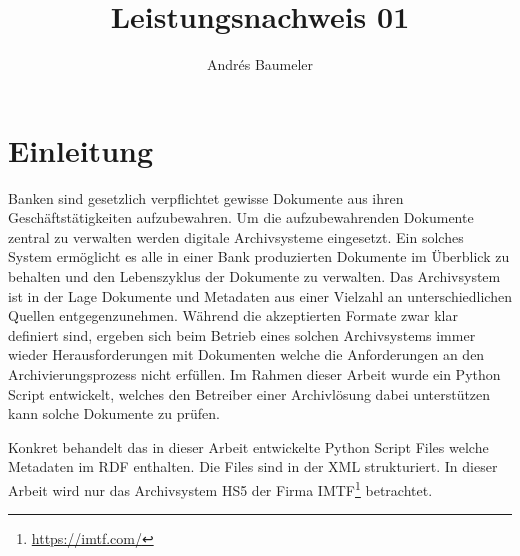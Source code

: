 \documentclass[a4paper,oneside, 12pt]{report}
\title{Leistungsnachweis 01}
\author{Andrés Baumeler}
\begin{document}

\pagestyle{empty} %





\cleardoublepage
\tableofcontents %
\cleardoublepage %

\pagestyle{plain} %



\chapter{Einleitung}\label{sec:motivation}
Banken sind gesetzlich verpflichtet gewisse Dokumente aus ihren Geschäftstätigkeiten aufzubewahren. Um die aufzubewahrenden Dokumente zentral zu verwalten werden digitale Archivsysteme eingesetzt. Ein solches System ermöglicht es alle in einer Bank produzierten Dokumente im Überblick zu behalten und den Lebenszyklus der Dokumente zu verwalten. Das Archivsystem ist in der Lage Dokumente und Metadaten aus einer Vielzahl an unterschiedlichen Quellen entgegenzunehmen. Während die akzeptierten Formate zwar klar definiert sind, ergeben sich beim Betrieb eines solchen Archivsystems immer wieder Herausforderungen mit Dokumenten welche die Anforderungen an den Archivierungsprozess nicht erfüllen. Im Rahmen dieser Arbeit wurde ein Python Script entwickelt, welches den Betreiber einer Archivlösung dabei unterstützen kann solche Dokumente zu prüfen.

Konkret behandelt das in dieser Arbeit entwickelte Python Script Files welche Metadaten im \ac{RDF} enthalten. Die Files sind in der \ac{XML} strukturiert. In dieser Arbeit wird nur das Archivsystem \ac{HS5} der Firma IMTF\footnote{\url{https://imtf.com/}} betrachtet.
\end{document}
